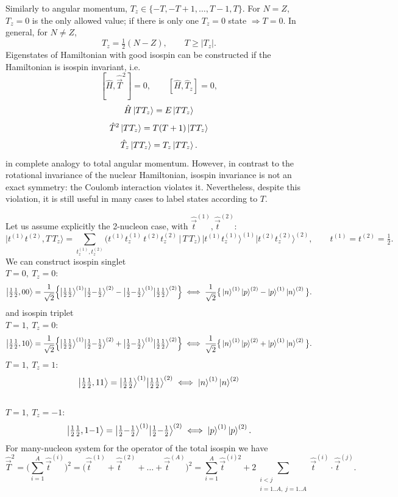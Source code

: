 \documentclass[11pt,a4paper]{article}
\newcommand{\op}[1]{\hat{#1}}
\begin{document}
Similarly to angular momentum, $T_z\in\{-T,-T+1,\dots,T-1,T\}$. For $N=Z$,
$T_z=0$ is the only allowed value; if there is only one $T_z=0$ state $\Rightarrow
T=0$. In general, for $N\ne Z$,
\[
T_z=\tfrac12(N-Z),\qquad T\ge |T_z| .
\]
Eigenstates of Hamiltonian with good isospin can be constructed if the Hamiltonian is isospin invariant, i.e.  
\[
[\op H,\op {\vec T}^2]=0,\qquad [\op H,\op T_z]=0, 
\]
\[
\op H \ket{T T_z} = E \ket{T T_z} 
\]
\[
\op T^2\ket{T T_z}=T(T+1)\ket{T T_z}
\]
\[
\op T_z\ket{T T_z }=T_z\ket{T  T_z}.
\]
in complete analogy to total angular momentum. 
However, in contrast to the rotational invariance of the nuclear Hamiltonian, isospin invariance is not an exact symmetry: the Coulomb interaction violates it. Nevertheless, despite this violation, it is still useful in many cases to label states according to $T$.
\\
\par 
Let us assume explicitly the 2-nucleon case, with $\op{\vec t}^{(1)},\op{\vec t}^{(2)}$:
\[
\big|t^{(1)}t^{(2)},T\,T_z\big\rangle=
\sum_{t_z^{(1)},t_z^{(2)}}
\big(t^{(1)}t_z^{(1)}\,t^{(2)}t_z^{(2)}\,\big|\,T\,T_z\big)\,
\big|t^{(1)}t_z^{(1)}\big\rangle^{(1)}\big|t^{(2)}t_z^{(2)}\big\rangle^{(2)},
\qquad t^{(1)}=t^{(2)}=\tfrac12 .
\]
We can construct isospin singlet \\
$T=0,\ T_z=0$:
\[
\big|\tfrac12\tfrac12,00\big\rangle
=\frac{1}{\sqrt2}\Big\{\big|\tfrac12\tfrac12\big\rangle^{(1)}\big|\tfrac12{-}\tfrac12\big\rangle^{(2)}
-\big|\tfrac12{-}\tfrac12\big\rangle^{(1)}\big|\tfrac12\tfrac12\big\rangle^{(2)}\Big\}
\;\Longleftrightarrow\;
\frac{1}{\sqrt2}\big\{\ket{n}^{(1)}\ket{p}^{(2)}-\ket{p}^{(1)}\ket{n}^{(2)}\big\}.
\]
and isospin triplet \\
$T=1,\ T_z=0$:
\[
\big|\tfrac12\tfrac12,10\big\rangle
=\frac{1}{\sqrt2}\Big\{\big|\tfrac12\tfrac12\big\rangle^{(1)}\big|\tfrac12{-}\tfrac12\big\rangle^{(2)}
+\big|\tfrac12{-}\tfrac12\big\rangle^{(1)}\big|\tfrac12\tfrac12\big\rangle^{(2)}\Big\}
\;\Longleftrightarrow\;
\frac{1}{\sqrt2}\big\{\ket{n}^{(1)}\ket{p}^{(2)}+\ket{p}^{(1)}\ket{n}^{(2)}\big\}.
\]
$T=1,\ T_z=1$: \\
\[
\big|\tfrac12\tfrac12,11\big\rangle=\big|\tfrac12\tfrac12\big\rangle^{(1)}\big|\tfrac12\tfrac12\big\rangle^{(2)}
\;\Longleftrightarrow\;
\ket n^{(1)}\ket n^{(2)}
\]
\\
$T=1,\ T_z=-1$:\\
\[
\big|\tfrac12\tfrac12,1{-}1\big\rangle=\big|\tfrac12{-}\tfrac12\big\rangle^{(1)}\big|\tfrac12{-}\tfrac12\big\rangle^{(2)}
\;\Longleftrightarrow\; \ket p^{(1)}\ket p^{(2)}.
\]
For many-nucleon system for the operator of the total isospin we have 
\[
\op {\vec T}^2=\Big(\sum_{i=1}^A\op{\vec t}^{(i)}\Big)^2
=\big(\op{\vec t}^{(1)}+\op{\vec t}^{(2)}+\dots+\op{\vec t}^{(A)}\big)^2
=\sum_{i=1}^A \op{\vec t}^{(i)2}+2\!\!\sum_{\substack{i<j\\ i=1..A,\;j=1..A}}\!\!\op{\vec t}^{(i)}\!\cdot\op{\vec t}^{(j)} .
\]
\end{document}
